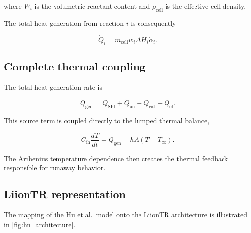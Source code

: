 where $W_i$ is the volumetric reactant content and
$\rho_{\mathrm{cell}}$ is the effective cell density.

The total heat generation from reaction $i$ is consequently

\begin{equation}
    \dot{Q}_i
    =
    m_{\mathrm{cell}}
    w_i
    \Delta H_i
    \dot{\alpha}_i.
    \label{eq:hu_reaction_heat}
\end{equation}


\subsection{Complete thermal coupling}

The total heat-generation rate is

\begin{equation}
    \dot{Q}_{\mathrm{gen}}
    =
    \dot{Q}_{\mathrm{SEI}}
    +
    \dot{Q}_{\mathrm{an}}
    +
    \dot{Q}_{\mathrm{cat}}
    +
    \dot{Q}_{\mathrm{el}}.
    \label{eq:hu_total_heat}
\end{equation}

This source term is coupled directly to the lumped thermal balance,

\begin{equation}
    C_{\mathrm{th}}
    \frac{dT}{dt}
    =
    \dot{Q}_{\mathrm{gen}}
    -
    hA
    \left(
        T-T_{\infty}
    \right).
    \label{eq:hu_thermal_balance}
\end{equation}

The Arrhenius temperature dependence then creates the thermal feedback
responsible for runaway behavior.


\subsection{LiionTR representation}

The mapping of the Hu et al.\ model onto the LiionTR architecture is
illustrated in \cref{fig:hu_architecture}.

